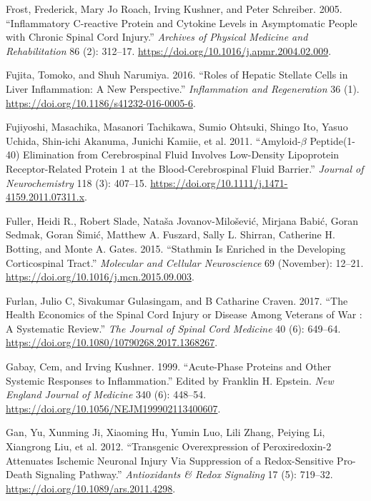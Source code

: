 \documentclass[9pt,lineno]{elife}
\newlength{\cslhangindent}
\newlength{\cslentryspacingunit} %
\newenvironment{CSLReferences}[2] %
 {%
  \setlength{\parindent}{0pt}
  \ifodd #1
  \let\oldpar\par
  \def\par{\hangindent=\cslhangindent\oldpar}
  \fi
  \setlength{\parskip}{#2\cslentryspacingunit}
 }%
 {}
\begin{document}
\begin{CSLReferences}{1}{0}
\leavevmode{}%
Frost, Frederick, Mary Jo Roach, Irving Kushner, and Peter Schreiber. 2005. {``Inflammatory {C-reactive} Protein and Cytokine Levels in Asymptomatic People with Chronic Spinal Cord Injury.''} \emph{Archives of Physical Medicine and Rehabilitation} 86 (2): 312--17. \url{https://doi.org/10.1016/j.apmr.2004.02.009}.

\leavevmode{}%
Fujita, Tomoko, and Shuh Narumiya. 2016. {``Roles of Hepatic Stellate Cells in Liver Inflammation: A New Perspective.''} \emph{Inflammation and Regeneration} 36 (1). \url{https://doi.org/10.1186/s41232-016-0005-6}.

\leavevmode{}%
Fujiyoshi, Masachika, Masanori Tachikawa, Sumio Ohtsuki, Shingo Ito, Yasuo Uchida, Shin-ichi Akanuma, Junichi Kamiie, et al. 2011. {``Amyloid-{\(\beta\)} Peptide(1-40) Elimination from Cerebrospinal Fluid Involves Low-Density Lipoprotein Receptor-Related Protein 1 at the Blood-Cerebrospinal Fluid Barrier.''} \emph{Journal of Neurochemistry} 118 (3): 407--15. \url{https://doi.org/10.1111/j.1471-4159.2011.07311.x}.

\leavevmode{}%
Fuller, Heidi R., Robert Slade, Nataša Jovanov-Milošević, Mirjana Babić, Goran Sedmak, Goran Šimić, Matthew A. Fuszard, Sally L. Shirran, Catherine H. Botting, and Monte A. Gates. 2015. {``Stathmin Is Enriched in the Developing Corticospinal Tract.''} \emph{Molecular and Cellular Neuroscience} 69 (November): 12--21. \url{https://doi.org/10.1016/j.mcn.2015.09.003}.

\leavevmode{}%
Furlan, Julio C, Sivakumar Gulasingam, and B Catharine Craven. 2017. {``The {Health Economics} of the Spinal Cord Injury or Disease Among Veterans of War : {A} Systematic Review.''} \emph{The Journal of Spinal Cord Medicine} 40 (6): 649--64. \url{https://doi.org/10.1080/10790268.2017.1368267}.

\leavevmode{}%
Gabay, Cem, and Irving Kushner. 1999. {``Acute-{Phase Proteins} and {Other Systemic Responses} to {Inflammation}.''} Edited by Franklin H. Epstein. \emph{New England Journal of Medicine} 340 (6): 448--54. \url{https://doi.org/10.1056/NEJM199902113400607}.

\leavevmode{}%
Gan, Yu, Xunming Ji, Xiaoming Hu, Yumin Luo, Lili Zhang, Peiying Li, Xiangrong Liu, et al. 2012. {``Transgenic {Overexpression} of {Peroxiredoxin-2 Attenuates Ischemic Neuronal Injury Via Suppression} of a {Redox-Sensitive Pro-Death Signaling Pathway}.''} \emph{Antioxidants \& Redox Signaling} 17 (5): 719--32. \url{https://doi.org/10.1089/ars.2011.4298}.


\end{CSLReferences}
\end{document}
